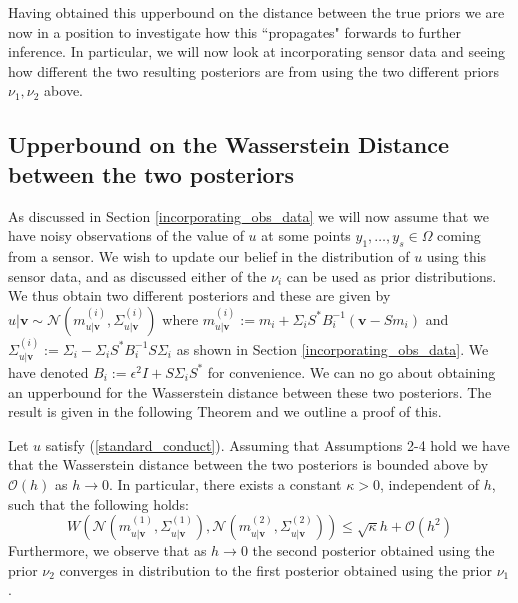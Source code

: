Having obtained this upperbound on the distance between the true priors we are now in a position to investigate how this ``propagates" forwards to further inference. In particular, we will now look at incorporating sensor data and seeing how different the two resulting posteriors are from using the two different priors $\nu_1,\nu_2$ above.

\subsection{Upperbound on the Wasserstein Distance between the two posteriors}

As discussed in Section \textcolor{blue}{\ref{incorporating_obs_data}} we will now assume that we have noisy observations of the value of $u$ at some points $y_1,\dots,y_s\in\Omega$ coming from a sensor. We wish to update our belief in the distribution of $u$ using this sensor data, and as discussed either of the $\nu_i$ can be used as prior distributions. We thus obtain two different posteriors and these are given by $u|\mathbf{v}\sim\mathcal{N}(m^{(i)}_{u|\mathbf{v}},\Sigma^{(i)}_{u|\mathbf{v}})$ where $m^{(i)}_{u|\mathbf{v}}:=m_{i}+\Sigma_{i}S^{*}B_{i}^{-1}(\mathbf{v}-Sm_{i})$ and $\Sigma^{(i)}_{u|\mathbf{v}}:=\Sigma_{i}-\Sigma_{i}S^{*}B_{i}^{-1}S\Sigma_{i}$ as shown in Section \textcolor{blue}{\ref{incorporating_obs_data}}. We have denoted $B_{i}:=\epsilon^{2}I+S\Sigma_{i}S^{*}$ for convenience. We can no go about obtaining an upperbound for the Wasserstein distance between these two posteriors. The result is given in the following Theorem and we outline a proof of this.
\vspace{10pt}

\begin{theorem}
    \label{posterior_difference_bound}
    Let $u$ satisfy (\ref{standard_conduct}). Assuming that Assumptions 2-4 hold we have that the Wasserstein distance between the two posteriors is bounded above by $\mathcal{O}(h)$ as $h\rightarrow 0$. In particular, there exists a constant $\kappa>0$, independent of $h$, such that the following holds:
    \begin{equation}
        \label{post_bound}
        W\left(\mathcal{N}(m^{(1)}_{u|\mathbf{v}},\Sigma^{(1)}_{u|\mathbf{v}}),\mathcal{N}(m^{(2)}_{u|\mathbf{v}},\Sigma^{(2)}_{u|\mathbf{v}})\right)\leq\sqrt{\kappa} h + \mathcal{O}(h^2)
    \end{equation}
    Furthermore, we observe that as $h\rightarrow 0$ the second posterior obtained using the prior $\nu_2$ converges in distribution to the first posterior obtained using the prior $\nu_1$.
\end{theorem}

